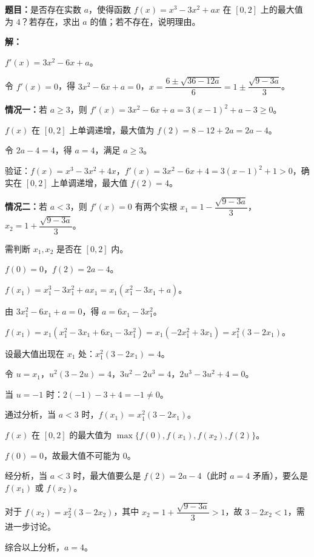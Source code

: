 \documentclass[12pt, a4paper]{ctexart}
\begin{document}
\begin{examplebox}[【例题11】构造法求存在性问题中的参数]
\textbf{题目：}是否存在实数 $a$，使得函数 $f(x) = x^3 - 3x^2 + ax$ 在 $[0, 2]$ 上的最大值为 $4$？若存在，求出 $a$ 的值；若不存在，说明理由。

\medskip
\textbf{解：}

$f'(x) = 3x^2 - 6x + a$。

令 $f'(x) = 0$，得 $3x^2 - 6x + a = 0$，$x = \dfrac{6 \pm \sqrt{36 - 12a}}{6} = 1 \pm \dfrac{\sqrt{9 - 3a}}{3}$。

\textbf{情况一：}若 $a \geq 3$，则 $f'(x) = 3x^2 - 6x + a = 3(x-1)^2 + a - 3 \geq 0$。

$f(x)$ 在 $[0, 2]$ 上单调递增，最大值为 $f(2) = 8 - 12 + 2a = 2a - 4$。

令 $2a - 4 = 4$，得 $a = 4$，满足 $a \geq 3$。

验证：$f(x) = x^3 - 3x^2 + 4x$，$f'(x) = 3x^2 - 6x + 4 = 3(x-1)^2 + 1 > 0$，确实在 $[0,2]$ 上单调递增，最大值 $f(2) = 4$。\checkmark

\textbf{情况二：}若 $a < 3$，则 $f'(x) = 0$ 有两个实根 $x_1 = 1 - \dfrac{\sqrt{9-3a}}{3}$，$x_2 = 1 + \dfrac{\sqrt{9-3a}}{3}$。

需判断 $x_1, x_2$ 是否在 $[0, 2]$ 内。

$f(0) = 0$，$f(2) = 2a - 4$。

$f(x_1) = x_1^3 - 3x_1^2 + ax_1 = x_1(x_1^2 - 3x_1 + a)$。

由 $3x_1^2 - 6x_1 + a = 0$，得 $a = 6x_1 - 3x_1^2$。

$f(x_1) = x_1(x_1^2 - 3x_1 + 6x_1 - 3x_1^2) = x_1(-2x_1^2 + 3x_1) = x_1^2(3 - 2x_1)$。

设最大值出现在 $x_1$ 处：$x_1^2(3 - 2x_1) = 4$。

令 $u = x_1$，$u^2(3 - 2u) = 4$，$3u^2 - 2u^3 = 4$，$2u^3 - 3u^2 + 4 = 0$。

当 $u = -1$ 时：$2(-1) - 3 + 4 = -1 \neq 0$。

通过分析，当 $a < 3$ 时，$f(x_1) = x_1^2(3 - 2x_1)$。

$f(x)$ 在 $[0, 2]$ 的最大值为 $\max\{f(0), f(x_1), f(x_2), f(2)\}$。

$f(0) = 0$，故最大值不可能为 $0$。

经分析，当 $a < 3$ 时，最大值要么是 $f(2) = 2a - 4$（此时 $a = 4$ 矛盾），要么是 $f(x_1)$ 或 $f(x_2)$。

对于 $f(x_2) = x_2^2(3 - 2x_2)$，其中 $x_2 = 1 + \dfrac{\sqrt{9-3a}}{3} > 1$，故 $3 - 2x_2 < 1$，需进一步讨论。

综合以上分析，$\boxed{a = 4}$。
\end{examplebox}
\end{document}

